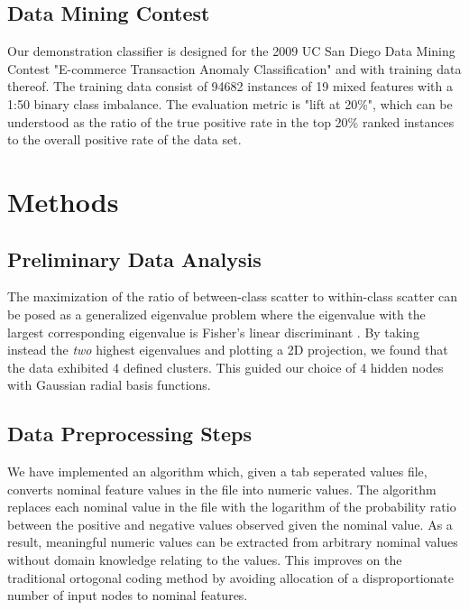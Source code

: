 \documentclass[11pt]{article}       %
\begin{document}
\subsection{Data Mining Contest} \label{contest}
Our demonstration classifier is designed for the 2009 UC San Diego Data Mining Contest "E-commerce Transaction Anomaly Classification" and with training data thereof. The training data consist of 94682 instances of 19 mixed features with a 1:50 binary class imbalance. The evaluation metric is "lift at 20\%", which can be understood as the ratio of the true positive rate in the top 20\% ranked instances to the overall positive rate of the data set.

\section{Methods} \label{algimp}

\subsection{Preliminary Data Analysis} \label{prelim}
The maximization of the ratio of between-class scatter to within-class scatter can be posed as a generalized eigenvalue problem where the eigenvalue with the largest corresponding eigenvalue is Fisher's linear discriminant \cite[\S 3.8.2]{Duda}. By taking instead the \emph{two} highest eigenvalues and plotting a 2D projection, we found that the data exhibited 4 defined clusters. This  guided our choice of 4 hidden nodes with Gaussian radial basis functions.

\subsection{Data Preprocessing Steps} \label{preprocessing}
We have implemented an algorithm which, given a tab seperated values file, converts nominal feature values in the file into numeric values.  The algorithm replaces each nominal value in the file with the logarithm of the probability ratio between the positive and negative values observed given the nominal value.  As a result, meaningful numeric values can be extracted from arbitrary nominal values without domain knowledge relating to the values. This improves on the traditional ortogonal coding method \cite[slide 17]{MLP-NominalCoding} by avoiding allocation of a disproportionate number of input nodes to nominal features.
\end{document}
